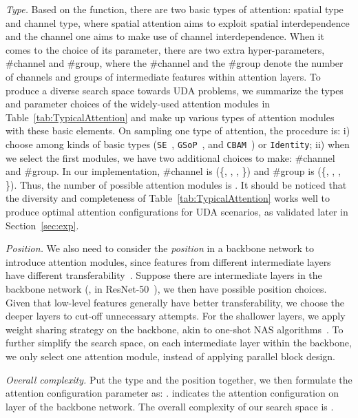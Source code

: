 \documentclass[10pt,twocolumn,letterpaper]{article}
\begin{document}
 \textit{Type.}
Based on the function, there are two basic types of attention: spatial type and channel type, where spatial attention aims to exploit spatial interdependence and the channel one aims to make use of channel interdependence. When it comes to the choice of its parameter, there are two extra hyper-parameters, \#channel and \#group, where the \#channel and the \#group denote the number of channels and groups of intermediate features within attention layers. To produce a diverse search space towards UDA problems, we summarize the types and parameter choices of the widely-used attention modules in Table~\ref{tab:TypicalAttention} and make up various types of attention modules with these basic elements. On sampling one type of attention, the procedure is: i) choose among  kinds of basic types (\texttt{SE}~\cite{hu2018SENet}, \texttt{GSoP}~\cite{gao2019GSoP}, and \texttt{CBAM}~\cite{woo2018cbam}) or \texttt{Identity}; ii) when we select the first  modules, we have two additional choices to make: \#channel and \#group. In our implementation, \#channel is  (\{, , , \}) and \#group is  (\{, , , \}).
Thus, the number of possible attention modules is .
It should be noticed that the diversity and completeness of Table~\ref{tab:TypicalAttention} works well to produce optimal attention configurations for UDA scenarios, as validated later in Section~\ref{sec:exp}.



 \textit{Position.}
We also need to consider the \emph{position} in a backbone network to introduce attention modules, since features from different intermediate layers have different transferability~\cite{yosinski2014transferable}. Suppose there are  intermediate layers in the backbone network (\eg,  in ResNet-50~\cite{he2016resnet}), we then have  possible position choices.
Given that low-level features generally have better transferability, we choose the deeper  layers to cut-off unnecessary attempts. For the shallower  layers, we apply weight sharing strategy on the backbone, akin to one-shot NAS algorithms~\cite{bender2018oneshotNAS,guo2020SPOS}.
To further simplify the search space, on each intermediate layer within the backbone, we only select one attention module, instead of applying parallel block design.

 \textit{Overall complexity.}
Put the type and the position together, we then formulate the attention configuration parameter  as: .  indicates the attention configuration on layer  of the backbone network. The overall complexity of our search space  is \textcolor{black}{}.
\end{document}
